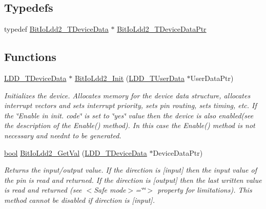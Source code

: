 \subsection*{Typedefs}
\begin{DoxyCompactItemize}
\item 
typedef \hyperlink{struct_bit_io_ldd2___t_device_data}{Bit\+Io\+Ldd2\+\_\+\+T\+Device\+Data} $\ast$ \hyperlink{group___bit_io_ldd2__module_ga58ccd058cbac67111c82dca4fa83692b}{Bit\+Io\+Ldd2\+\_\+\+T\+Device\+Data\+Ptr}
\end{DoxyCompactItemize}
\subsection*{Functions}
\begin{DoxyCompactItemize}
\item 
\hyperlink{group___p_e___types__module_gac5cf1362f1f0e3a2ce71b1bf2276d091}{L\+D\+D\+\_\+\+T\+Device\+Data} $\ast$ \hyperlink{group___bit_io_ldd2__module_ga553dbb392db7bc92230a019512a1e5ab}{Bit\+Io\+Ldd2\+\_\+\+Init} (\hyperlink{group___p_e___types__module_ga0b66a73f87238a782318aa0be7578e35}{L\+D\+D\+\_\+\+T\+User\+Data} $\ast$User\+Data\+Ptr)
\begin{DoxyCompactList}\small\item\em Initializes the device. Allocates memory for the device data structure, allocates interrupt vectors and sets interrupt priority, sets pin routing, sets timing, etc. If the \char`\"{}\+Enable
    in init. code\char`\"{} is set to \char`\"{}yes\char`\"{} value then the device is also enabled(see the description of the Enable() method). In this case the Enable() method is not necessary and needn\textquotesingle{}t to be generated. \end{DoxyCompactList}\item 
\hyperlink{group___p_e___types__module_ga97a80ca1602ebf2303258971a2c938e2}{bool} \hyperlink{group___bit_io_ldd2__module_gab03a5a6cf33499000ac033b999a4f587}{Bit\+Io\+Ldd2\+\_\+\+Get\+Val} (\hyperlink{group___p_e___types__module_gac5cf1362f1f0e3a2ce71b1bf2276d091}{L\+D\+D\+\_\+\+T\+Device\+Data} $\ast$Device\+Data\+Ptr)
\begin{DoxyCompactList}\small\item\em Returns the input/output value. If the direction is \mbox{[}input\mbox{]} then the input value of the pin is read and returned. If the direction is \mbox{[}output\mbox{]} then the last written value is read and returned (see $<$\+Safe mode$>$=\char`\"{}\char`\"{}$>$ property for limitations). This method cannot be disabled if direction is \mbox{[}input\mbox{]}. \end{DoxyCompactList}\item 

\end{DoxyCompactItemize}
